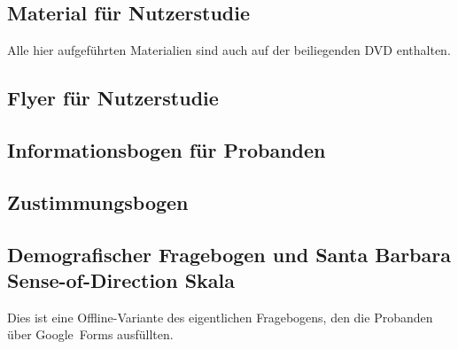 \appendix
\begin{appendices}
    \chapter{Material für Nutzerstudie}
    \label{appendix:study_material}
    Alle hier aufgeführten Materialien sind auch auf der beiliegenden DVD enthalten.
    
    \section*{Flyer für Nutzerstudie}
    \label{appendix:study_flyer}
    \begin{center}
    \end{center}
    
    \section*{Informationsbogen für Probanden}
    \label{appendix:study_infos}
    \begin{center}
        
    \end{center}
    
    \section*{Zustimmungsbogen}
    \label{appendix:study_consent}
    \begin{center}
    \end{center}
    
    \section*{Demografischer Fragebogen und Santa Barbara Sense-of-Direction Skala}
    \label{appendix:demographic}
    Dies ist eine Offline-Variante des eigentlichen Fragebogens, den die Probanden über Google~Forms ausfüllten.
    \begin{center}
    \end{center}
    

\end{appendices}
